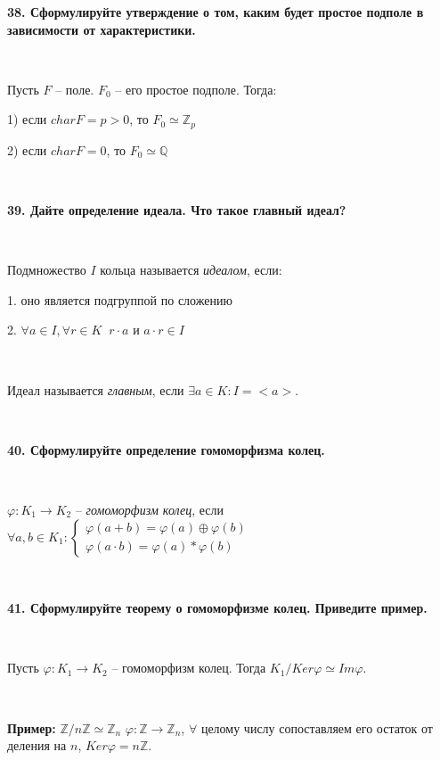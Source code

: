 \documentclass{article}
\begin{document}
    \textbf{38. Сформулируйте утверждение о том, каким будет простое подполе в зависимости от характеристики.}

    {
        $\;$
        \setlength{\parindent}{0.4cm}
        \hangindent=0.4cm

    Пусть $F$ -- поле. $F_0$ -- его простое подполе. Тогда:

    1) если $char F=p>0$, то $F_0\simeq \mathbb{Z}_p$

        2) если $char F=0$, то $F_0\simeq\mathbb{Q}$

        $\;$
        \setlength{\parindent}{0cm}
        \hangindent=0cm
    }

    \textbf{39. Дайте определение идеала. Что такое главный идеал?}

    {
        $\;$
        \setlength{\parindent}{0.4cm}
        \hangindent=0.4cm

    Подмножество $I$ кольца называется \textit{идеалом}, если:

    1. оно является подгруппой по сложению

    2. $\forall a\in I, \forall r\in K\;\; r\cdot a$ и $a\cdot r\in I$

        $\;$

        Идеал называется \textit{главным}, если $\exists a\in K:I=<a>$.

        $\;$
        \setlength{\parindent}{0cm}
        \hangindent=0cm
    }

    \textbf{40. Сформулируйте определение гомоморфизма колец.}

    {
        $\;$
        \setlength{\parindent}{0.4cm}
        \hangindent=0.4cm

        $\varphi:K_1\rightarrow K_2$ -- \textit{гомоморфизм колец}, если $\forall a, b\in K_1:\begin{cases}
                                                                                                  \varphi(a+b)=\varphi(a)\oplus\varphi(b)\\
                                                                                                  \varphi(a\cdot b)=\varphi(a)\ast\varphi(b)
    \end{cases}$

        $\;$
        \setlength{\parindent}{0cm}
        \hangindent=0cm
    }

    \textbf{41. Сформулируйте теорему о гомоморфизме колец. Приведите пример.}

    {
        $\;$
        \setlength{\parindent}{0.4cm}
        \hangindent=0.4cm

    Пусть $\varphi:K_1\rightarrow K_2$ -- гомоморфизм колец. Тогда $K_1/Ker\varphi\simeq Im\varphi$.

        $\;$

        \textbf{Пример:} $\mathbb{Z}/n\mathbb{Z}\simeq\mathbb{Z}_n$ $\varphi:\mathbb{Z}\rightarrow\mathbb{Z}_n$, $\forall$ целому числу сопоставляем его остаток от деления на $n$, $Ker \varphi=n\mathbb{Z}$.

        $\;$
        \setlength{\parindent}{0cm}
        \hangindent=0cm
    }
\end{document}
